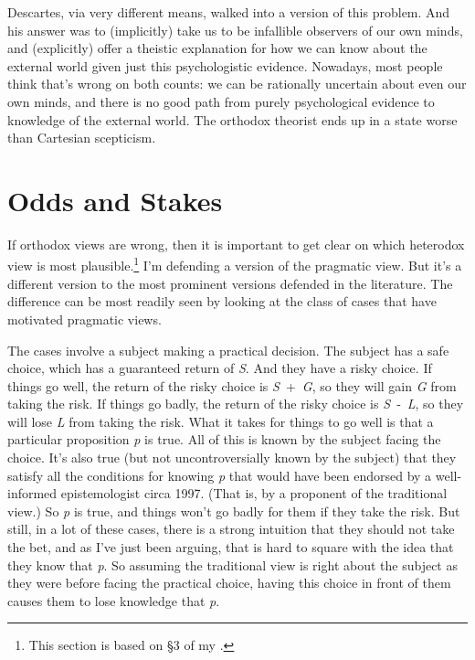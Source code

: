 \documentclass[
  11pt,
]{book}
\begin{document}
Descartes, via very different means, walked into a version of this problem. And his answer was to (implicitly) take us to be infallible observers of our own minds, and (explicitly) offer a theistic explanation for how we can know about the external world given just this psychologistic evidence. Nowadays, most people think that's wrong on both counts: we can be rationally uncertain about even our own minds, and there is no good path from purely psychological evidence to knowledge of the external world. The orthodox theorist ends up in a state worse than Cartesian scepticism.

\hypertarget{oddsandstakes}{%
\section{Odds and Stakes}\label{oddsandstakes}}

If orthodox views are wrong, then it is important to get clear on which heterodox view is most plausible.\footnote{This section is based on §3 of my \citeyearpar{Weatherson2016}.} I'm defending a version of the pragmatic view. But it's a different version to the most prominent versions defended in the literature. The difference can be most readily seen by looking at the class of cases that have motivated pragmatic views.

The cases involve a subject making a practical decision. The subject has a safe choice, which has a guaranteed return of \emph{S}. And they have a risky choice. If things go well, the return of the risky choice is \emph{S}~+~\emph{G}, so they will gain \emph{G} from taking the risk. If things go badly, the return of the risky choice is \emph{S}~‑~\emph{L}, so they will lose \emph{L} from taking the risk. What it takes for things to go well is that a particular proposition \emph{p} is true. All of this is known by the subject facing the choice. It's also true (but not uncontroversially known by the subject) that they satisfy all the conditions for knowing \emph{p} that would have been endorsed by a well-informed epistemologist circa 1997. (That is, by a proponent of the traditional view.) So \emph{p} is true, and things won't go badly for them if they take the risk. But still, in a lot of these cases, there is a strong intuition that they should not take the bet, and as I've just been arguing, that is hard to square with the idea that they know that \emph{p}. So assuming the traditional view is right about the subject as they were before facing the practical choice, having this choice in front of them causes them to lose knowledge that \emph{p}.
\end{document}
